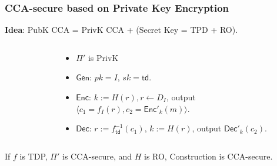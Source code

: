 \begin{frame}\frametitle{CCA-secure based on Private Key Encryption}
\textbf{Idea}: PubK CCA = PrivK CCA + (Secret Key = TPD + RO).  

\begin{columns}[t]
\begin{column}{5cm}
\begin{figure}[t]
\begin{center}

\end{center}
\end{figure}\end{column}
\begin{column}{5cm}
\begin{construction}
\begin{itemize}
\item $\Pi'$ is PrivK
\item $\mathsf{Gen}$: $pk = I$, $sk = \mathsf{td}$.
\item $\mathsf{Enc}$: $k := H(r), r \gets D_I$, output $\langle c_1= f_I(r), c_2 = \mathsf{Enc}'_k(m)\rangle$.
\item $\mathsf{Dec}$: $r := f^{-1}_{\mathsf{td}}(c_1)$, $k:=H(r)$, output $\mathsf{Dec}'_k(c_2)$.
\end{itemize}
\end{construction}

\end{column}
\end{columns}


\begin{theorem}
If $f$ is TDP, $\Pi'$ is CCA-secure, and $H$ is RO, Construction is CCA-secure.
\end{theorem}
\end{frame}
